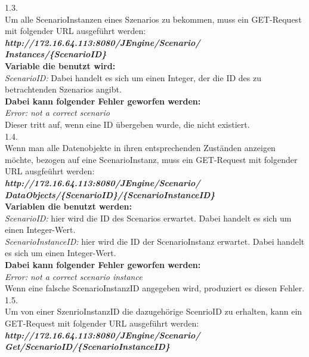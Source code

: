 \begin{enumerate}
1.3.\\ Um alle ScenarioInstanzen eines Szenarios zu bekommen, muss ein GET-Request mit folgender URL ausgeführt werden:\\
\textbf{\textit{http://172.16.64.113:8080/JEngine/Scenario/\\Instances/\{ScenarioID\}}}\\

\textbf{Variable die benutzt wird:}\\
\textit{ScenarioID:} Dabei handelt es sich um einen Integer, der die ID des zu betrachtenden Szenarios angibt.\\

\textbf{Dabei kann folgender Fehler geworfen werden:}\\
\textit{Error: not a correct scenario}\\ Dieser tritt auf, wenn eine ID übergeben wurde, die nicht existiert.\\

1.4.\\ Wenn man alle Datenobjekte in ihren entsprechenden Zuständen anzeigen möchte, bezogen auf eine ScenarioInstanz, muss ein GET-Request mit folgender URL ausgfeührt werden:\\
\textbf{\textit{http://172.16.64.113:8080/JEngine/Scenario/\\DataObjects/\{ScenarioID\}/\{ScenarioInstanceID\}}}\\

\textbf{Variablen die benutzt werden:}\\
\textit{ScenarioID:} hier wird die ID des Scenarios erwartet. Dabei handelt es sich um einen Integer-Wert.\\
\textit{ScenarioInstanceID:} hier wird die ID der ScenarioInstanz erwartet. Dabei handelt es sich um einen Integer-Wert.\\

\textbf{Dabei kann folgender Fehler geworfen werden:}\\
\textit{Error: not a correct scenario instance}\\ Wenn eine falsche ScenarioInstanzID angegeben wird, produziert es diesen Fehler.\\

1.5.\\ Um von einer SzenrioInstanzID die dazugehörige ScenrioID zu erhalten, kann ein GET-Request mit folgender URL ausgeführt werden:\\ 
\textbf{\textit{http://172.16.64.113:8080/JEngine/Scenario/\\Get/ScenarioID/\{ScenarioInstanceID\}}}\\


\end{enumerate}
